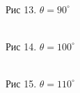\documentclass[12pt]{article}
\begin{document}
  \begin{figure}[h!]
    \begin{minipage}[h]{0.32\linewidth}
      \\
      Рис 13. $\theta = 90^{\circ}$
    \end{minipage}
    \begin{minipage}[h]{0.32\linewidth}
      \\
      Рис 14. $\theta = 100^{\circ}$
    \end{minipage}
    \begin{minipage}[h]{0.32\linewidth}
      \\
      Рис 15. $\theta = 110^{\circ}$
    \end{minipage}
  \end{figure}
\end{document}
